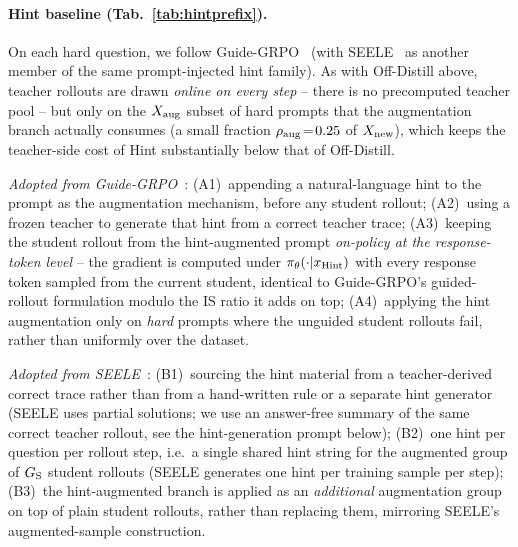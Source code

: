\documentclass{llmxive}
\begin{document}
\paragraph{Hint baseline (Tab.~\ref{tab:hintprefix}).}
On each hard question, we follow Guide-GRPO~\citep{nath2025adaptive} (with SEELE~\citep{li2025staying} as another member of the same prompt-injected hint family). As with Off-Distill above, teacher rollouts are drawn \emph{online on every step} -- there is no precomputed teacher pool -- but only on the $X_{\rm aug}$ subset of hard prompts that the augmentation branch actually consumes (a small fraction $\rho_{\rm aug}\!=\!0.25$ of $X_{\rm new}$), which keeps the teacher-side cost of Hint substantially below that of Off-Distill.

\emph{Adopted from Guide-GRPO}~\citep{nath2025adaptive}: (A1)~appending a natural-language hint to the prompt as the augmentation mechanism, before any student rollout; (A2)~using a frozen teacher to generate that hint from a correct teacher trace; (A3)~keeping the student rollout from the hint-augmented prompt \emph{on-policy at the response-token level} -- the gradient is computed under $\pi_\theta(\cdot|x_{\rm Hint})$ with every response token sampled from the current student, identical to Guide-GRPO's guided-rollout formulation modulo the IS ratio it adds on top; (A4)~applying the hint augmentation only on \emph{hard} prompts where the unguided student rollouts fail, rather than uniformly over the dataset.

\emph{Adopted from SEELE}~\citep{li2025staying}: (B1)~sourcing the hint material from a teacher-derived correct trace rather than from a hand-written rule or a separate hint generator (SEELE uses partial solutions; we use an answer-free summary of the same correct teacher rollout, see the hint-generation prompt below); (B2)~one hint per question per rollout step, i.e.\ a single shared hint string for the augmented group of $G_{\rm S}$ student rollouts (SEELE generates one hint per training sample per step); (B3)~the hint-augmented branch is applied as an \emph{additional} augmentation group on top of plain student rollouts, rather than replacing them, mirroring SEELE's augmented-sample construction.
\end{document}
